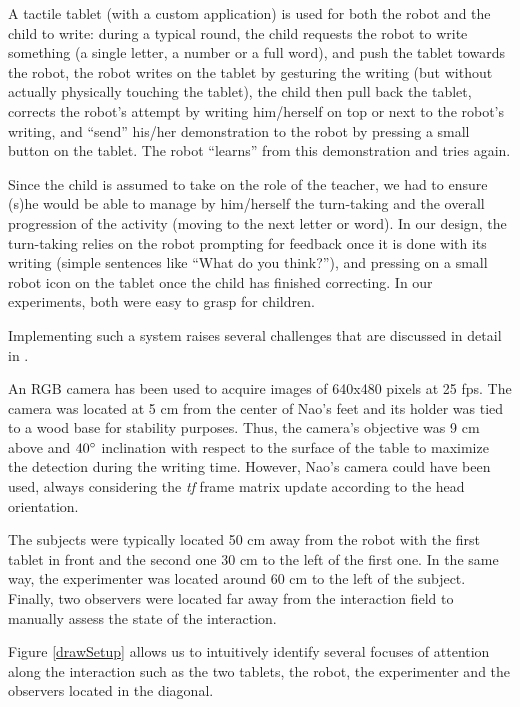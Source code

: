 \documentclass{sig-alternate}
\begin{document}
A tactile tablet (with a custom application) is used for both the robot and the
child to write: during a typical round, the child requests the robot to write
something (a single letter, a number or a full word), and push the tablet
towards the robot, the robot writes on the tablet by gesturing the writing (but
without actually physically touching the tablet), the child then pull back the
tablet, corrects the robot's attempt by writing him/herself on top or next to
the robot's writing, and ``send'' his/her demonstration to the robot by pressing
a small button on the tablet. The robot ``learns'' from this demonstration and
tries again.

Since the child is assumed to take on the role of the teacher, we had to ensure
(s)he would be able to manage by him/herself the turn-taking and the overall
progression of the activity (moving to the next letter or word). In our design,
the turn-taking relies on the robot prompting for feedback once it is done with
its writing (simple sentences like ``What do you think?''), and pressing on a
small robot icon on the tablet once the child has finished correcting. In our
experiments, both were easy to grasp for children.

Implementing such a system raises several challenges that are discussed in
detail in \cite{Hood:2015}.

An RGB camera has been used to acquire images of 640x480 pixels at 25 fps. The
camera was located at 5 cm from the center of Nao's feet and its holder was tied
to a wood base for stability purposes. Thus, the camera's objective was 9 cm
above and $ 40\degree $ inclination with respect to the surface of the table to
maximize the detection during the writing time. However, Nao's camera could have
been used, always considering the \textit{tf} frame matrix update according to
the head orientation.

The subjects were typically located 50 cm away from the robot with the first
tablet in front and the second one 30 cm to the left of the first one. In the
same way, the experimenter was located around 60 cm to the left of the subject.
Finally, two observers were located far away from the interaction field to
manually assess the state of the interaction.

Figure \ref{drawSetup} allows us to intuitively identify several focuses of
attention along the interaction such as the two tablets, the robot, the
experimenter and the observers located in the diagonal.
\end{document}
